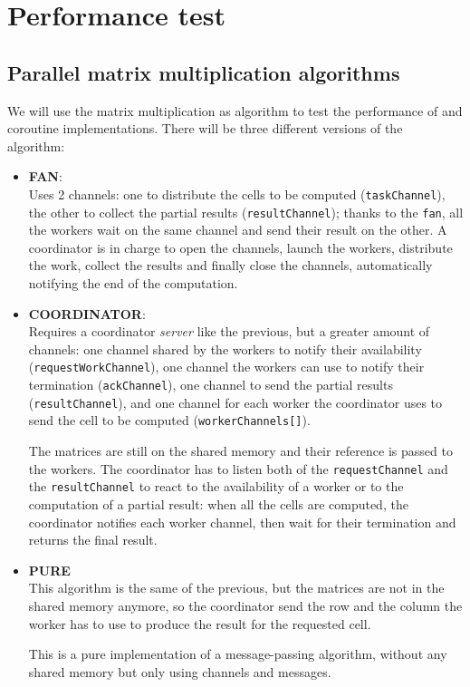 \section{Performance test}

\subsection{Parallel matrix multiplication algorithms}

We will use the matrix multiplication as algorithm to test the performance of \Kotlin and \Go coroutine implementations. There will be three different versions of the algorithm:

\begin{itemize}
	\item \textbf{FAN}:\\
	Uses 2 channels: one to distribute the cells to be computed (\texttt{taskChannel}), the other to collect the partial results (\texttt{resultChannel}); thanks to the \texttt{fan}, all the workers wait on the same channel and send their result on the other. A coordinator is in charge to open the channels, launch the workers, distribute the work, collect the results and finally close the channels, automatically notifying the end of the computation.
	
	\item \textbf{COORDINATOR}:\\
	Requires a coordinator \textit{server} like the previous, but a greater amount of channels: one channel shared  by the workers to notify their availability (\texttt{requestWorkChannel}), one channel the workers can use to notify their termination (\texttt{ackChannel}), one channel to send the partial results (\texttt{resultChannel}), and one channel for each worker the coordinator uses to send the cell to be computed (\texttt{workerChannels[]}). 
	
	The matrices are still on the shared memory and their reference is passed to the workers. The coordinator has to listen both of the \texttt{requestChannel} and the 	\texttt{resultChannel} to react to the availability of a worker or to the computation of a partial result: when all the cells are computed, the coordinator notifies each worker channel, then wait for their termination and returns the final result.
	
	\item \textbf{PURE}\\
	This algorithm is the same of the previous, but the matrices are not in the shared memory anymore, so the coordinator send the row and the column the worker has to use to produce the result for the requested cell.
	
	This is a pure implementation of a message-passing algorithm, without any shared memory but only using channels and messages.
\end{itemize}

